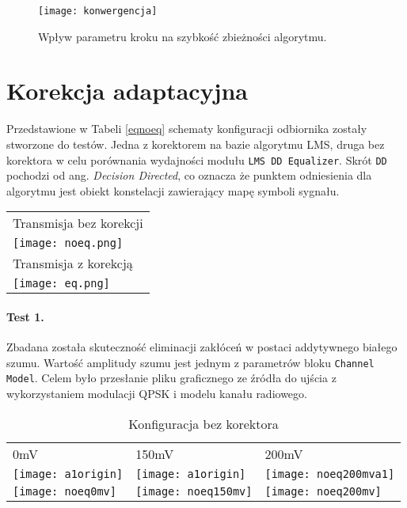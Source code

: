 \begin{figure}[h]
\centering
\texttt{[image: konwergencja]}
\caption{Wpływ parametru kroku na szybkość zbieżności algorytmu.}
\label{fig:sine4}
\end{figure}

\section{Korekcja adaptacyjna}

Przedstawione w Tabeli \ref{eqnoeq} schematy konfiguracji odbiornika zostały stworzone do testów.
Jedna z korektorem na bazie algorytmu LMS, druga bez korektora w celu porównania wydajności modułu \texttt{LMS DD Equalizer}. 
Skrót \texttt{DD} pochodzi od ang. \textit{Decision Directed}, co oznacza że punktem odniesienia dla algorytmu jest obiekt konstelacji zawierający mapę symboli sygnału. \cite{dd_lms_eq}

\begin{sidewaystable}[t]
\centering
\caption{Diagramy konfiguracji odbiornika}
\label{eqnoeq}
\begin{tabular}{l}
\hline
Transmisja bez korekcji \\
\texttt{[image: noeq.png]}\\ \hline
Transmisja z korekcją   \\
\texttt{[image: eq.png]}\\
\end{tabular}
\end{sidewaystable}

\paragraph{Test 1.}
Zbadana została skuteczność eliminacji zakłóceń w postaci addytywnego białego szumu.
Wartość amplitudy szumu jest jednym z parametrów bloku \texttt{Channel Model}.
Celem było przesłanie pliku graficznego ze źródła do ujścia z wykorzystaniem modulacji QPSK i modelu kanału radiowego.


\begin{table}[h]
\centering
\caption{Konfiguracja bez korektora}
\label{tab:noeq}
\begin{tabular}{|l|l|l|}
\hline
0mV      & 150mV    & 200mV    \\
\texttt{[image: a1origin]} & \texttt{[image: a1origin]} & \texttt{[image: noeq200mva1]} \\
\texttt{[image: noeq0mv]}   & \texttt{[image: noeq150mv]}   & \texttt{[image: noeq200mv]}  \\ \hline
\end{tabular}
\end{table}

